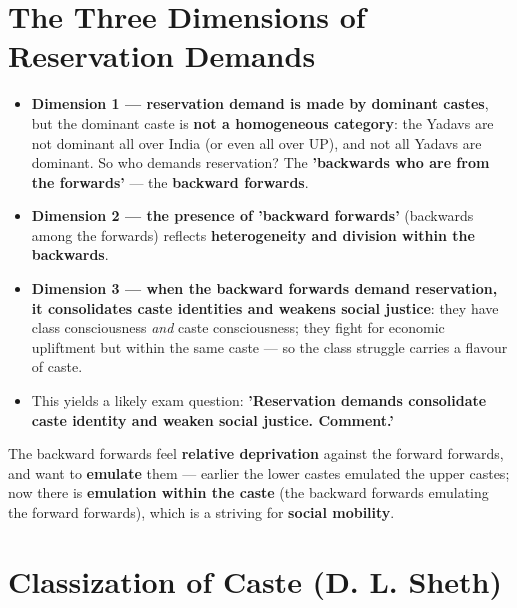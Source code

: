 \section{The Three Dimensions of Reservation Demands}

\begin{KeyConcept}
\begin{itemize}
\item \textbf{Dimension 1 --- reservation demand is made by dominant castes}, but the dominant caste is \textbf{not a homogeneous category}: the Yadavs are not dominant all over India (or even all over UP), and not all Yadavs are dominant. So who demands reservation? The \textbf{'backwards who are from the forwards'} --- the \textbf{backward forwards}.
\item \textbf{Dimension 2 --- the presence of 'backward forwards'} (backwards among the forwards) reflects \textbf{heterogeneity and division within the backwards}.
\item \textbf{Dimension 3 --- when the backward forwards demand reservation, it consolidates caste identities and weakens social justice}: they have class consciousness \emph{and} caste consciousness; they fight for economic upliftment but within the same caste --- so the class struggle carries a flavour of caste.
\item This yields a likely exam question: \textbf{'Reservation demands consolidate caste identity and weaken social justice. Comment.'}
\end{itemize}
\end{KeyConcept}

\begin{KeyConcept}
The backward forwards feel \textbf{relative deprivation} against the forward forwards, and want to \textbf{emulate} them --- earlier the lower castes emulated the upper castes; now there is \textbf{emulation within the caste} (the backward forwards emulating the forward forwards), which is a striving for \textbf{social mobility}.
\end{KeyConcept}

\section{Classization of Caste (D. L. Sheth)}

